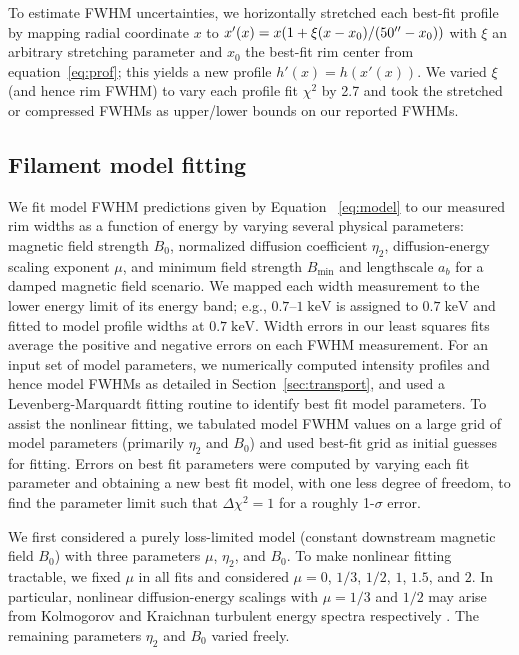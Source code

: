 \documentclass[iop, apj, numberedappendix]{emulateapj}
\newcommand*{\mt}{\mathrm}
\newcommand*{\unit}[1]{\;\mt{#1}}  %
\newcommand*{\Bmin}{B_{\mt{min}}}
\begin{document}
To estimate FWHM uncertainties, we horizontally stretched each best-fit
profile by mapping radial coordinate $x$ to
$x'(x) = x (1 + \xi (x-x_0)/(50\mbox{$^{\prime\prime}$}-x_0))$ with $\xi$ an arbitrary stretching
parameter and $x_0$ the best-fit rim center from equation~\eqref{eq:prof};
this yields a new profile $h'(x) = h(x'(x))$.
We varied $\xi$ (and hence rim FWHM) to vary each profile fit $\chi^2$ by 2.7
and took the stretched or compressed FWHMs as upper/lower bounds on our
reported FWHMs.

\subsection{Filament model fitting}
\label{sec:fits}

We fit model FWHM predictions given by Equation~ \eqref{eq:model} to our
measured rim widths as a function of energy by varying several physical
parameters: magnetic field strength $B_0$, normalized diffusion coefficient
$\eta_2$, diffusion-energy scaling exponent $\mu$, and minimum field strength
$\Bmin$ and lengthscale $a_b$ for a damped magnetic field scenario.  We
mapped each width measurement to the lower energy limit of its energy band;
e.g., $0.7$--$1 \unit{keV}$ is assigned to $0.7 \unit{keV}$ and fitted to model
profile widths at $0.7 \unit{keV}$.  Width errors in our least squares fits
average the positive and negative errors on each FWHM measurement.  For an
input set of model parameters, we numerically computed intensity profiles and
hence model FWHMs as detailed in Section~\ref{sec:transport}, and used a
Levenberg-Marquardt fitting routine to identify best fit model parameters.
To assist the nonlinear fitting, we tabulated model FWHM values on a large grid
of model parameters (primarily $\eta_2$ and $B_0$) and used best-fit grid as
initial guesses for fitting.
Errors on best fit parameters were computed by varying each fit parameter and
obtaining a new best fit model, with one less degree of freedom, to find the
parameter limit such that $\Delta \chi^2 = 1$ for a roughly 1-$\sigma$ error.

We first considered a purely loss-limited model (constant downstream magnetic
field $B_0$) with three parameters $\mu$, $\eta_2$, and $B_0$.  To make
nonlinear fitting tractable, we fixed $\mu$ in all fits and considered $\mu =
0$, $1/3$, $1/2$, $1$, $1.5$, and $2$.  In particular, nonlinear
diffusion-energy scalings with $\mu = 1/3$ and $1/2$ may arise from Kolmogorov
and Kraichnan turbulent energy spectra respectively \citep{reynolds2004}.  The
remaining parameters $\eta_2$ and $B_0$ varied freely.
\end{document}
